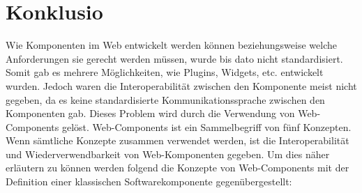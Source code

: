 \section{Konklusio}
\label{sec:7_Konklusion}

Wie Komponenten im Web entwickelt werden können beziehungsweise welche Anforderungen sie gerecht werden müssen, wurde bis dato nicht standardisiert. Somit gab es mehrere Möglichkeiten, wie Plugins, Widgets, etc. entwickelt wurden. Jedoch waren die Interoperabilität zwischen den Komponente meist nicht gegeben, da es keine standardisierte Kommunikationssprache zwischen den Komponenten gab. Dieses Problem wird durch die Verwendung von Web-Components gelöst. Web-Components ist ein Sammelbegriff von fünf Konzepten. Wenn sämtliche Konzepte zusammen verwendet werden, ist die Interoperabilität und Wiederverwendbarkeit von Web-Komponenten gegeben. Um dies näher erläutern zu können werden folgend die Konzepte von Web-Components mit der Definition einer klassischen Softwarekomponente gegenübergestellt:

